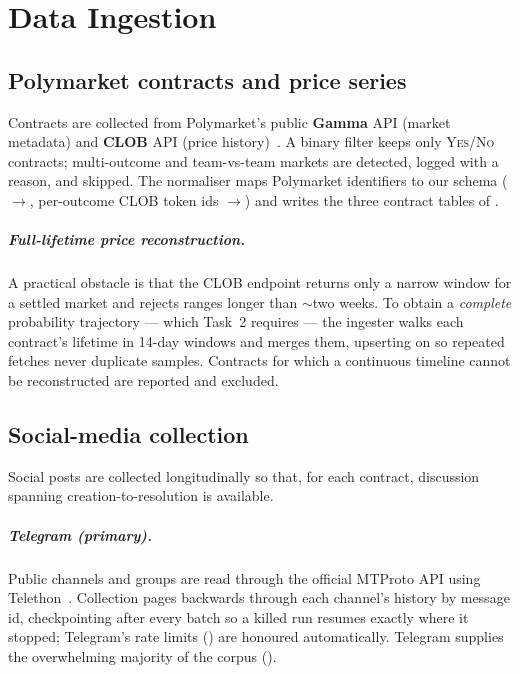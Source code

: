 \chapter{Data Ingestion}
\label{ch:ingestion}

\section{Polymarket contracts and price series}
Contracts are collected from Polymarket's public \textbf{Gamma} API (market metadata)
and \textbf{CLOB} API (price history)~\cite{polymarketdocs}. A binary filter keeps only
\textsc{Yes}/\textsc{No} contracts; multi-outcome and team-vs-team markets are detected,
logged with a reason, and skipped. The normaliser maps Polymarket identifiers to our
schema ($\rightarrow$, per-outcome CLOB token ids
$\rightarrow$) and writes the three contract tables of
.

\paragraph{Full-lifetime price reconstruction.}
A practical obstacle is that the CLOB  endpoint returns only a
narrow window for a settled market and rejects ranges longer than ${\sim}$two weeks.
To obtain a \emph{complete} probability trajectory --- which Task~2 requires --- the
ingester walks each contract's lifetime in 14-day windows and merges them, upserting
on  so repeated fetches never duplicate
samples. Contracts for which a continuous timeline cannot be reconstructed are
reported and excluded.

\section{Social-media collection}
\label{sec:social-collection}
Social posts are collected longitudinally so that, for each contract, discussion
spanning creation-to-resolution is available.

\paragraph{Telegram (primary).} Public channels and groups are read through the
official MTProto API using Telethon~\cite{telethon}. Collection pages backwards
through each channel's history by message id, checkpointing after every batch so a
killed run resumes exactly where it stopped; Telegram's rate limits
() are honoured automatically. Telegram supplies the overwhelming
majority of the corpus ().

